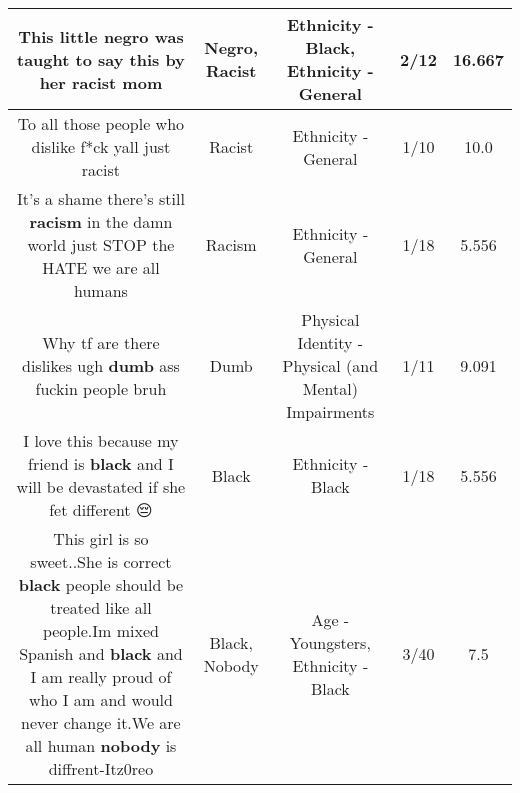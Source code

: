 \documentclass[11pt]{article}
\newlength\mylength
\begin{document}
\begin{center}
\begin{longtable}{|C{.65\mylength}|C{.30\mylength}|C{.12\mylength}|C{.12\mylength}|C{.12\mylength}|}
  \small This little \textbf{negro} was taught to say this by her \textbf{racist} mom\normalsize   & Negro, Racist & Ethnicity - Black, Ethnicity - General & 2/12 & 16.667 \\  \hline
  \small To all those people who dislike f*ck yall just racist\normalsize   & Racist & Ethnicity - General & 1/10 & 10.0 \\  \hline
  \small It's a shame there's still \textbf{racism} in the damn world just STOP the HATE we are all humans\normalsize   & Racism & Ethnicity - General & 1/18 & 5.556 \\  \hline
  \small Why tf are there dislikes ugh \textbf{dumb} ass fuckin people bruh\normalsize   & Dumb & Physical Identity - Physical (and Mental) Impairments & 1/11 & 9.091 \\  \hline
  \small I love this because my friend is \textbf{black} and I will be devastated if she fet different 😔\normalsize   & Black & Ethnicity - Black & 1/18 & 5.556 \\  \hline
  \small This girl is so sweet..She is correct \textbf{black} people should be treated like all people.Im mixed Spanish and \textbf{black} and I am really proud of who I am and would never change it.We are all human \textbf{nobody} is diffrent-Itz0reo\normalsize   & Black, Nobody & Age - Youngsters, Ethnicity - Black & 3/40 & 7.5 \\  \hline

\end{longtable}
\end{center}
\end{document}
